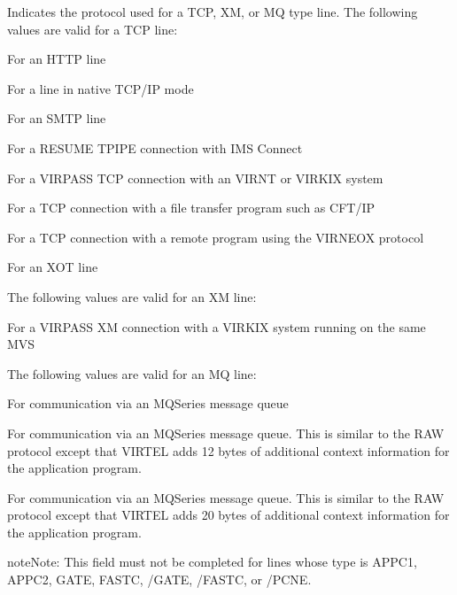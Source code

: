 \documentclass[letterpaper,10pt,english]{sphinxmanual}
\begin{document}
\begin{description}
\sphinxAtStartPar
Indicates the protocol used for a TCP, XM, or MQ type line. The
following values are valid for a TCP line:
\begin{description}
\sphinxAtStartPar
For an HTTP line

\sphinxAtStartPar
For a line in native TCP/IP mode

\sphinxAtStartPar
For an SMTP line

\sphinxAtStartPar
For a RESUME TPIPE connection with IMS Connect

\sphinxAtStartPar
For a VIRPASS TCP connection with an VIRNT or VIRKIX system

\sphinxAtStartPar
For a TCP connection with a file transfer program such as CFT/IP

\sphinxAtStartPar
For a TCP connection with a remote program using the VIRNEOX
protocol

\sphinxAtStartPar
For an XOT line

\end{description}

\sphinxAtStartPar
The following values are valid for an XM line:
\begin{description}
\sphinxAtStartPar
For a VIRPASS XM connection with a VIRKIX system running on the same MVS

\end{description}

\sphinxAtStartPar
The following values are valid for an MQ line:
\begin{description}
\sphinxAtStartPar
For communication via an MQSeries message queue

\sphinxAtStartPar
For communication via an MQSeries message queue. This is similar to
the RAW protocol except that VIRTEL adds 12 bytes of additional
context information for the application program.

\sphinxAtStartPar
For communication via an MQSeries message queue. This is similar to
the RAW protocol except that VIRTEL adds 20 bytes of additional
context information for the application program.

\begin{sphinxadmonition}{note}{Note:}
\sphinxAtStartPar
This field must not be completed for lines whose type is APPC1, APPC2, GATE, FASTC, /GATE, /FASTC, or /PCNE.
\end{sphinxadmonition}


\end{description}
\end{description}
\end{document}

